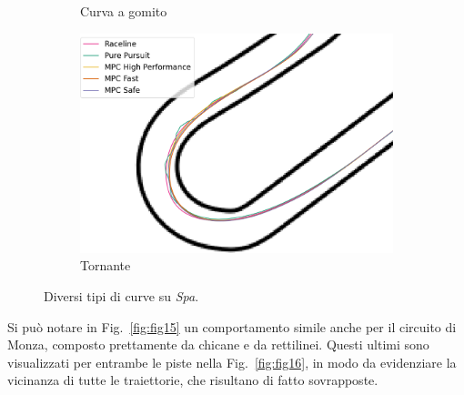 \begin{figure}[H]
\begin{subfigure}{0.49\textwidth}
        \caption{Curva a gomito}
        \label{fig:curva_spa}
    \end{subfigure}
    \begin{subfigure}[b]{0.50\textwidth}
        \centering
        \includegraphics[width=\textwidth]{images/spa_traj_comparison_tornante.png}
        \caption{Tornante}
        \label{fig:torn_spa}
    \end{subfigure}
    \caption{Diversi tipi di curve su \textit{Spa}.}
    \label{fig:fig14} %
\end{figure}

Si può notare in Fig.~\ref{fig:fig15} un comportamento simile anche per il circuito di Monza, 
composto prettamente da chicane e da rettilinei. Questi ultimi sono visualizzati per entrambe
le piste nella Fig.~\ref{fig:fig16}, in modo da evidenziare la vicinanza di tutte le traiettorie, 
che risultano di fatto sovrapposte.

